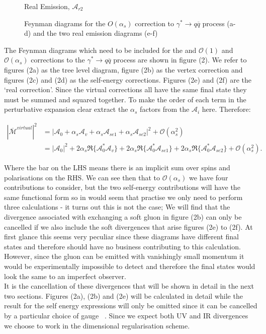 \begin{figure}[tpb]
\begin{minipage}{0.4\linewidth}
				\caption{Real Emission, $\mathcal{A}_{r2}$}
			\end{minipage}
		\caption{Feynman diagrams for the $O(\alpha_s)$ correction to $\gamma^*\rightarrow q\overline{q}$ process (a-d) and the two real emission diagrams (e-f)}\label{fig:NLOContributions}
	\end{figure}

	The Feynman diagrams which need to be included for the and $\mathcal{O}(1)$ and $\mathcal{O}(\alpha_s)$ corrections to the
	$\gamma^*\rightarrow q\overline{q}$ process are shown in figure (2).  We refer to figures (2a) as the tree level diagram,
	figure (2b) as the vertex correction and figures (2c) and (2d) as the self-energy corrections.  Figures (2e) and (2f) are
	the `real correction'.  Since the virtual corrections all have the same final state they must be summed and squared together.
	To make the order of each term in the perturbative expansion clear extract the $\alpha_s$ factors from the $\mathcal{A}_i$ here.  Therefore:

	\begin{equation}
	\begin{split}
	|\overline{\mathcal{M}}^{virtual}|^2 &= |\mathcal{A}_0 + \alpha_s\mathcal{A}_v + \alpha_s\mathcal{A}_{se1} + \alpha_s\mathcal{A}_{se2}|^2 + \mathcal{O}(\alpha_s^2) \\
	&= |\mathcal{A}_0|^2 + 2\alpha_s\Re\{\mathcal{A}^*_0\mathcal{A}_v\} + 2\alpha_s\Re\{\mathcal{A}^*_0\mathcal{A}_{se1}\} + 2\alpha_s\Re\{\mathcal{A}^*_0\mathcal{A}_{se2}\} + \mathcal{O}(\alpha_s^2).
	\end{split}
	\end{equation}

	Where the bar on the LHS means there is an implicit sum over spins and polarisations on the RHS.  We can see then that to
	$\mathcal{O}(\alpha_s)$ we have four contributions to consider, but the two self-energy contributions will have the same
	functional form so in would seem that practise we only need to perform three calculations - it turns out this is not the case;
	We will find that the divergence associated with exchanging a soft gluon in figure (2b) can only be cancelled if we also
	include the soft divergences that arise figures (2e) to (2f).  At first glance this seems very peculiar since these diagrams
	have different final states and therefore should have no business contributing to this calculation.  However, since the gluon
	can be emitted with vanishingly small momentum it would be experimentally impossible to detect and therefore the final states
	would look the same to an imperfect observer.\\It is the cancellation of these divergences that will be shown in detail
	in the next two sections.  Figures (2a), (2b) and (2e) will be calculated in detail while the result for the self energy
	expressions will only be omitted since it can be cancelled by a particular choice of gauge ~\cite{field}.  Since we
	expect both UV and IR divergences we choose to work in the dimensional regularisation scheme.

